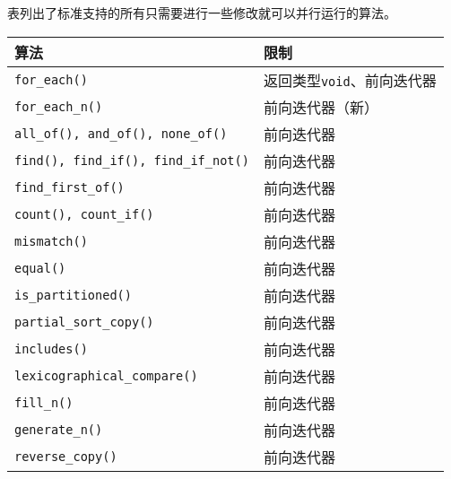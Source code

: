 表列出了标准支持的所有只需要进行一些修改就可以并行运行的算法。
\begin{table}[htb]
    \centering
    \begin{tabular}{l|l}
        \hline
        \textbf{算法}                                                         & \textbf{限制}             \\
        \hline
        \texttt{for\_each()}                                                & 返回类型\texttt{void}、前向迭代器 \\
        \texttt{for\_each\_n()}                                             & 前向迭代器（新）                \\
        \texttt{all\_of(), and\_of(), none\_of()}                           & 前向迭代器                   \\
        \texttt{find(), find\_if(), find\_if\_not()}                        & 前向迭代器                   \\
        \texttt{find\_first\_of()}                                          & 前向迭代器                   \\
        \texttt{count(), count\_if()}                                       & 前向迭代器                   \\
        \texttt{mismatch()}                                                 & 前向迭代器                   \\
        \texttt{equal()}                                                    & 前向迭代器                   \\
        \texttt{is\_partitioned()}                                          & 前向迭代器                   \\
        \texttt{partial\_sort\_copy()}                                      & 前向迭代器                   \\
        \texttt{includes()}                                                 & 前向迭代器                   \\
        \texttt{lexicographical\_compare()}                                 & 前向迭代器                   \\
        \texttt{fill\_n()}                                                  & 前向迭代器                   \\
        \texttt{generate\_n()}                                              & 前向迭代器                   \\
        \texttt{reverse\_copy()}                                            & 前向迭代器                   \\

\end{tabular}
\end{table}
